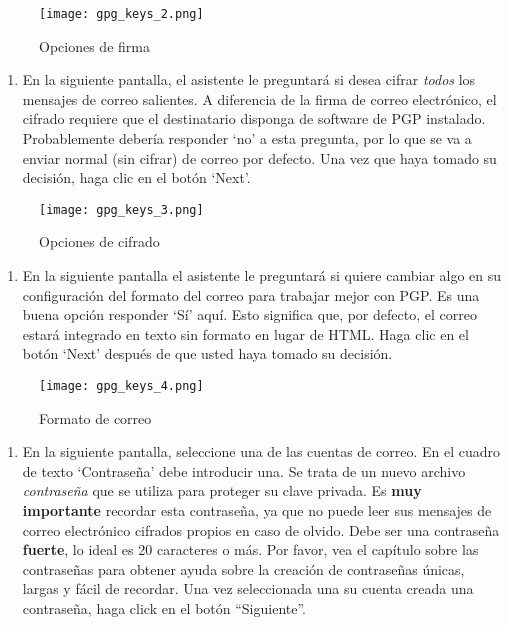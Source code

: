 \documentclass[10pt,a5paper,twoside,,]{book}
\providecommand{\tightlist}{%
  \setlength{\itemsep}{0pt}\setlength{\parskip}{0pt}}
\begin{document}
\begin{figure}[htbp]
\centering
\texttt{[image: gpg\_keys\_2.png]}
\caption{Opciones de firma}
\end{figure}

\begin{enumerate}
\def\labelenumi{\arabic{enumi}.}
\setcounter{enumi}{2}
\tightlist
\item
  En la siguiente pantalla, el asistente le preguntará si desea cifrar
  \emph{todos} los mensajes de correo salientes. A diferencia de la
  firma de correo electrónico, el cifrado requiere que el destinatario
  disponga de software de PGP instalado. Probablemente debería responder
  `no' a esta pregunta, por lo que se va a enviar normal (sin cifrar) de
  correo por defecto. Una vez que haya tomado su decisión, haga clic en
  el botón `Next'.
\end{enumerate}

\begin{figure}[htbp]
\centering
\texttt{[image: gpg\_keys\_3.png]}
\caption{Opciones de cifrado}
\end{figure}

\begin{enumerate}
\def\labelenumi{\arabic{enumi}.}
\setcounter{enumi}{3}
\tightlist
\item
  En la siguiente pantalla el asistente le preguntará si quiere cambiar
  algo en su configuración del formato del correo para trabajar mejor
  con PGP. Es una buena opción responder `Sí' aquí. Esto significa que,
  por defecto, el correo estará integrado en texto sin formato en lugar
  de HTML. Haga clic en el botón `Next' después de que usted haya tomado
  su decisión.
\end{enumerate}

\begin{figure}[htbp]
\centering
\texttt{[image: gpg\_keys\_4.png]}
\caption{Formato de correo}
\end{figure}

\begin{enumerate}
\def\labelenumi{\arabic{enumi}.}
\setcounter{enumi}{4}
\tightlist
\item
  En la siguiente pantalla, seleccione una de las cuentas de correo. En
  el cuadro de texto `Contraseña' debe introducir una. Se trata de un
  nuevo archivo \emph{contraseña} que se utiliza para proteger su clave
  privada. Es \textbf{muy importante} recordar esta contraseña, ya que
  no puede leer sus mensajes de correo electrónico cifrados propios en
  caso de olvido. Debe ser una contraseña \textbf{fuerte}, lo ideal es
  20 caracteres o más. Por favor, vea el capítulo sobre las contraseñas
  para obtener ayuda sobre la creación de contraseñas únicas, largas y
  fácil de recordar. Una vez seleccionada una su cuenta creada una
  contraseña, haga click en el botón ``Siguiente''.
\end{enumerate}
\end{document}
